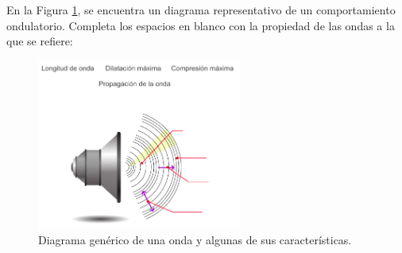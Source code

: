 \question[5] En la Figura \ref{fig:onda_sonido}, se encuentra un diagrama representativo de un comportamiento ondulatorio. Completa los espacios en blanco con la propiedad de las ondas a la que se refiere:
    \begin{figure}[H]
        \centering
        \includegraphics[width =0.6\textwidth ]{Images/onda_sonido.png}
        \caption{Diagrama gen\'erico de una onda y algunas de sus caracter\'isticas.}
        \label{fig:onda_sonido}
    \end{figure}